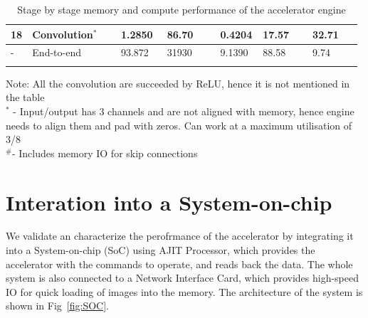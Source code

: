 \documentclass[a4paper,12pt, final]{report}
\begin{document}
\begin{table}
{\begin{tabular}{P{0.05\linewidth} P{0.25\linewidth} P{0.13\linewidth} P{0.15\linewidth} P{0.12\linewidth} P{0.14\linewidth} P{0.14\linewidth} }
		18 & Convolution$^*$ & 1.2850 & 86.70 & 0.4204 & 17.57 & 32.71\\
		\bottomrule
		- & End-to-end & 93.872 & 31930 & 9.1390 & 88.58 & 9.74\\
		\bottomrule
		\\
	\end{tabular}
	}
	Note: All the convolution are succeeded by ReLU, hence it is not mentioned in the table\\
	$^*$ - Input/output has 3 channels and are not aligned with memory, hence engine needs to align them and pad with zeros. Can work at a maximum utilisation of 3/8\\
	 $^\#$- Includes memory IO for skip connections\\
	 \caption{Stage by stage memory and compute performance of the accelerator engine}
	 \label{tab:stage}
\end{table}


\chapter{Interation into a System-on-chip}

We validate an characterize the perofrmance of the accelerator by integrating it into a System-on-chip (SoC) using AJIT Processor, which provides the accelerator with the commands to operate, and reads back the data. The whole system is also connected to a Network Interface Card, which provides high-speed IO for quick loading of images into the memory. The architecture of the system is shown in Fig~\ref{fig:SOC}.
\\
\end{document}

